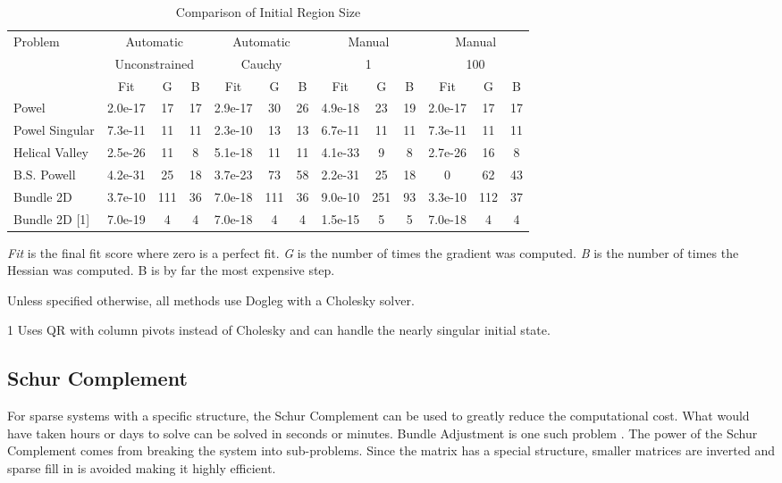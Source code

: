 \documentclass[peerreview,compsoc,onecolumn]{IEEEtran}
\begin{document}
\begin{table}[h]
\centering
\begin{threeparttable}
\caption{\label{results:initial_region}Comparison of Initial Region Size}
\begin{tabular}{|l||c|c|c||c|c|c||c|c|c||c|c|c|}
\hline
Problem        & \multicolumn{3}{c||}{Automatic} & \multicolumn{3}{c||}{Automatic} & \multicolumn{3}{c||}{Manual} & \multicolumn{3}{c|}{Manual}\\
               & \multicolumn{3}{c||}{Unconstrained} & \multicolumn{3}{c||}{Cauchy} & \multicolumn{3}{c||}{1} & \multicolumn{3}{c|}{100} \\
\hline
               & Fit     & G  & B  & Fit     & G  & B   & Fit     & G  & B  & Fit     & G  & B\\
\hline
Powel          & 2.0e-17 & 17 & 17 & 2.9e-17 & 30 & 26  & 4.9e-18 & 23 & 19 & 2.0e-17 & 17 & 17 \\
Powel Singular & 7.3e-11 & 11 & 11 & 2.3e-10 & 13 & 13  & 6.7e-11 & 11 & 11 & 7.3e-11 & 11 & 11 \\
Helical Valley & 2.5e-26 & 11 & 8  & 5.1e-18 & 11 & 11  & 4.1e-33 & 9  & 8  & 2.7e-26 & 16 & 8\\
B.S. Powell    & 4.2e-31 & 25 & 18 & 3.7e-23 & 73 & 58  & 2.2e-31 & 25 & 18 & 0       & 62 & 43 \\
Bundle 2D      & 3.7e-10 & 111& 36 & 7.0e-18 & 111& 36  & 9.0e-10 & 251& 93 & 3.3e-10 & 112 & 37 \\
Bundle 2D [1]  & 7.0e-19 & 4  & 4  & 7.0e-18 & 4  & 4   & 1.5e-15 & 5  & 5  & 7.0e-18 & 4 & 4 \\ \hline
\end{tabular}
\begin{tablenotes}
\small
\item \emph{Fit} is the final fit score where zero is a perfect fit. \emph{G} is the number of times the gradient was computed. \emph{B} is the number of times the Hessian was computed. B is by far the most expensive step.
\item Unless specified otherwise, all methods use Dogleg with a Cholesky solver. 
\item [1] Uses QR with column pivots instead of Cholesky and can handle the nearly singular initial state.
\end{tablenotes}
\end{threeparttable}
\end{table}

\subsection{Schur Complement}
For sparse systems with a specific structure, the Schur Complement can be used to greatly reduce the computational cost. What would have taken hours or days to solve can be solved in seconds or minutes. Bundle Adjustment is one such problem \cite{triggs1999bundle}. The power of the Schur Complement comes from breaking the system into sub-problems. Since the matrix has a special structure, smaller matrices are inverted and sparse fill in \cite{davis2006} is avoided making it highly efficient.
\end{document}
